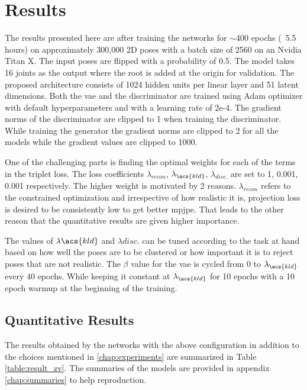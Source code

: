\chapter{Results}
\label{chap:results}
The results presented here are after training the networks for $\sim$400 epochs (~5.5 hours) on approximately 300,000 2D poses with a batch size of 2560 on an Nvidia Titan X. The input poses are flipped with a probability of 0.5. The model takes 16 joints as the output where the root is added at the origin for validation. The proposed architecture consists of 1024 hidden units per linear layer and 51 latent dimensions. Both the \ac{vae} and the discriminator are trained using Adam optimizer with default hyperparameters and with a learning rate of 2e-4. The gradient norms of the discriminator are clipped to 1 when training the discriminator. While training the generator the gradient norms are clipped to 2 for all the models while the gradient values are clipped to 1000.

One of the challenging parts is finding the optimal weights for each of the terms in the triplet loss. The loss coefficients $\lambda_{recon}$, $\lambda_{\acs{kld}}$, $\lambda_{disc.}$ are set to 1, 0.001, 0.001 respectively. The higher weight is motivated by 2 reasons. $\lambda_{recon}$ refers to the constrained optimization and irrespective of how realistic it is, projection loss is desired to be consistently low to get better \ac{mpjpe}. That leads to the other reason that the quantitative results are given higher importance.

The values of $\lambda{\acs{kld}}$ and $\lambda{disc.}$ can be tuned according to the task at hand based on how well the poses are to be clustered or how important it is to reject poses that are not realistic. The $\beta$ value for the \ac{vae} is cycled from 0 to $\lambda_{\acs{kld}}$ every 40 epochs. While keeping it constant at $\lambda_{\acs{kld}}$ for 10 epochs with a 10 epoch warmup at the beginning of the training.

\section{Quantitative Results}

The results obtained by the networks with the above configuration in addition to the choices mentioned in \ref{chap:experiments} are summarized in Table \ref{table:result_zv}. The summaries of the models are provided in appendix \ref{chap:summaries} to help reproduction.

